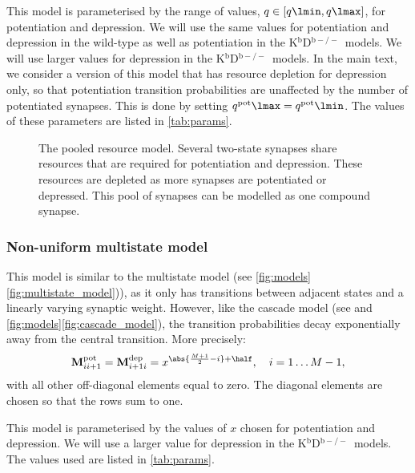 \documentclass[10pt]{article}
\newcommand{\M}{\mathbf{M}}
\newcommand{\pot}{^{\text{pot}}}
\newcommand{\dep}{^{\text{dep}}}
\newcommand{\KO}{K$^\mathrm{b}$D$^{\mathrm{b}-/-}$}
\begin{document}
This model is parameterised by the range of values, $q\in[q\lmin,q\lmax]$, for potentiation and depression.
We will use the same values for potentiation and depression in the wild-type as well as potentiation in the \KO\ models.
We will use larger values for depression in the \KO\ models.
In the main text, we consider a version of this model that has resource depletion for depression only, so that potentiation transition probabilities are unaffected by the number of potentiated synapses.
This is done by setting $q\pot\lmax=q\pot\lmin$.
The values of these parameters are listed in \autoref{tab:params}.


\begin{figure}
 \begin{center}
 \end{center}
  \caption[The pooled resource model]{The pooled resource model.
  Several two-state synapses share resources that are required for potentiation and depression.
  These resources are depleted as more synapses are potentiated or depressed.
  This pool of synapses can be modelled as one compound synapse.} \label{fig:pooled_model}
\end{figure}


\subsubsection{Non-uniform multistate model}\label{sec:nonunimodel}

This model is similar to the multistate model (see \autoref{fig:models}\ref{fig:multistate_model})), as it only has transitions between adjacent states and a linearly varying synaptic weight.
However, like the cascade model (see \cite{Fusi2005cascade} and \autoref{fig:models}\ref{fig:cascade_model}), the transition probabilities decay exponentially away from the central transition.
More precisely:
%
\begin{equation}\label{eq:nonunidef}
    \M\pot_{ii+1} = \M\dep_{i+1i} =  x^{\abs{\frac{M+1}{2}-i}+\half},
      \quad i = 1 \ldots M-1,
\end{equation}
%
with all other off-diagonal elements equal to zero.
The diagonal elements are chosen so that the rows sum to one.

This model is parameterised by the values of $x$ chosen for potentiation and depression.
We will use a larger value for depression in the \KO\ models.
The values used are listed in \autoref{tab:params}.
\end{document}
